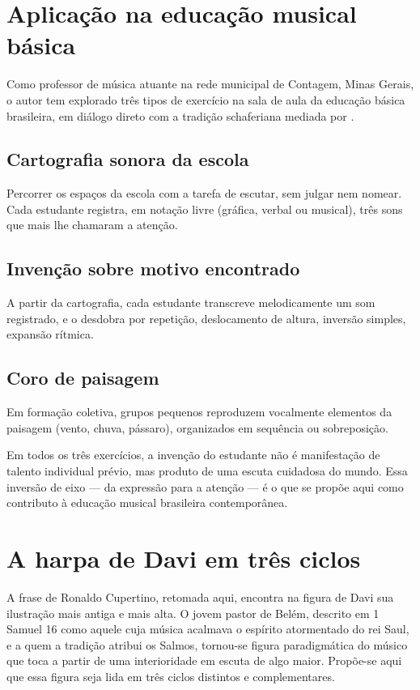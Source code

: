 \documentclass[12pt,a4paper]{article}
\begin{document}
\section{Aplicação na educação musical básica}

Como professor de música atuante na rede municipal de Contagem, Minas Gerais, o autor tem explorado três tipos de exercício na sala de aula da educação básica brasileira, em diálogo direto com a tradição schaferiana mediada por \citet{Fonterrada2008}.

\subsection{Cartografia sonora da escola}

Percorrer os espaços da escola com a tarefa de escutar, sem julgar nem nomear. Cada estudante registra, em notação livre (gráfica, verbal ou musical), três sons que mais lhe chamaram a atenção.

\subsection{Invenção sobre motivo encontrado}

A partir da cartografia, cada estudante transcreve melodicamente um som registrado, e o desdobra por repetição, deslocamento de altura, inversão simples, expansão rítmica.

\subsection{Coro de paisagem}

Em formação coletiva, grupos pequenos reproduzem vocalmente elementos da paisagem (vento, chuva, pássaro), organizados em sequência ou sobreposição.

Em todos os três exercícios, a invenção do estudante não é manifestação de talento individual prévio, mas produto de uma escuta cuidadosa do mundo. Essa inversão de eixo --- da expressão para a atenção --- é o que se propõe aqui como contributo à educação musical brasileira contemporânea.

\section{A harpa de Davi em três ciclos}

A frase de Ronaldo Cupertino, retomada aqui, encontra na figura de Davi sua ilustração mais antiga e mais alta. O jovem pastor de Belém, descrito em 1 Samuel 16 \citep{Biblia1993} como aquele cuja música acalmava o espírito atormentado do rei Saul, e a quem a tradição atribui os Salmos, tornou-se figura paradigmática do músico que toca a partir de uma interioridade em escuta de algo maior. Propõe-se aqui que essa figura seja lida em três ciclos distintos e complementares.
\end{document}
